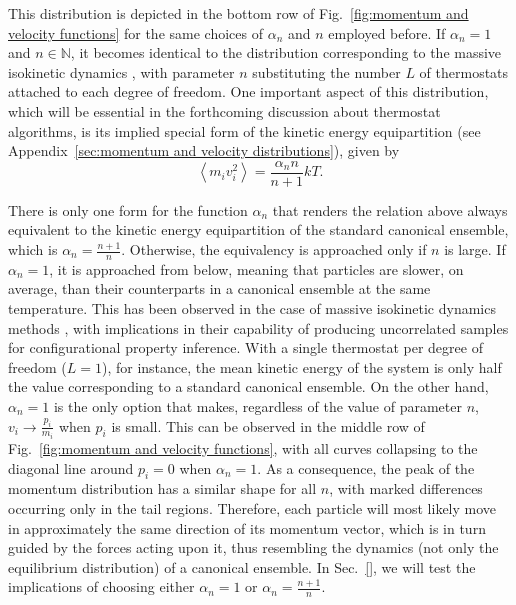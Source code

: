 \documentclass[
aip,
jcp,
reprint,
]{revtex4-1}
\newcommand{\nn}{n}
\begin{document}
This distribution is depicted in the bottom row of Fig.~\ref{fig:momentum and velocity functions} for the same choices of $\alpha_\nn$ and $\nn$ employed before.
If $\alpha_\nn = 1$ and $\nn \in \mathbb{N}$, it becomes identical to the distribution corresponding to the massive isokinetic dynamics \cite{Abreu_2020}, with parameter $\nn$ substituting the number $L$ of thermostats attached to each degree of freedom.
One important aspect of this distribution, which will be essential in the forthcoming discussion about thermostat algorithms, is its implied special form of the kinetic energy equipartition (see Appendix~\ref{sec:momentum and velocity distributions}), given by
\begin{equation}
\label{eq:special kinetic energy equipartition}
\left\langle m_i v_i^2 \right\rangle = \frac{\alpha_\nn \nn}{\nn+1} kT.
\end{equation}

There is only one form for the function $\alpha_\nn$ that renders the relation above always equivalent to the kinetic energy equipartition of the standard canonical ensemble, which is $\alpha_\nn = \frac{\nn+1}{\nn}$.
Otherwise, the equivalency is approached only if $\nn$ is large.
If $\alpha_\nn = 1$, it is approached from below, meaning that particles are slower, on average, than their counterparts in a canonical ensemble at the same temperature.
This has been observed in the case of massive isokinetic dynamics methods \cite{Abreu_2020}, with implications in their capability of producing uncorrelated samples for configurational property inference.
With a single thermostat per degree of freedom ($L=1$), for instance, the mean kinetic energy of the system is only half the value corresponding to a standard canonical ensemble.
On the other hand, $\alpha_\nn = 1$ is the only option that makes, regardless of the value of parameter $\nn$, $v_i \to \frac{p_i}{m_i}$ when $p_i$ is small.
This can be observed in the middle row of Fig.~\ref{fig:momentum and velocity functions}, with all curves collapsing to the diagonal line around $p_i = 0$ when $\alpha_\nn = 1$.
As a consequence, the peak of the momentum distribution has a similar shape for all $\nn$, with marked differences occurring only in the tail regions.
Therefore, each particle will most likely move in approximately the same direction of its momentum vector, which is in turn guided by the forces acting upon it, thus resembling the dynamics (not only the equilibrium distribution) of a canonical ensemble.
In Sec.~\ref{}, we will test the implications of choosing either $\alpha_\nn = 1$ or $\alpha_\nn = \frac{\nn+1}{\nn}$.
\end{document}
